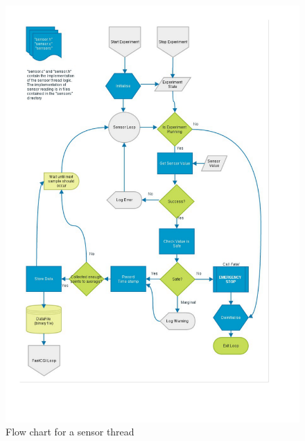 \pagebreak
\begin{figure}[H]
	\centering
	\includegraphics[width=1.1\textwidth]{figures/sensor_thread.pdf}
	\caption{Flow chart for a sensor thread} 
	\label{sensor_thread.pdf}
\end{figure}
\pagebreak
\pagebreak

